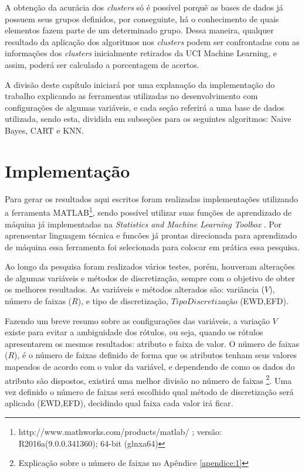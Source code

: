 A obtenção da acurácia dos \textit{clusters} só é possível porquê as bases de dados já possuem seus grupos definidos, por conseguinte, há o conhecimento de quais elementos fazem parte de um determinado grupo. Dessa maneira, qualquer resultado da aplicação dos algoritmos nos \textit{clusters} podem ser confrontadas com as informações dos \textit{clusters} inicialmente retirados da UCI Machine Learning, e assim, poderá ser calculado a porcentagem de acertos.

A divisão deste capítulo iniciará por uma explanação da implementação do trabalho explicando as ferramentas  utilizadas no desenvolvimento com configurações  de algumas variáveis, e cada seção referirá a uma base de dados utilizada, sendo esta, dividida em subseções para os seguintes algoritmos: Naive Bayes, CART e KNN.

\section{Implementação}\label{cap:resultados:sec:implement}

Para  gerar os resultados aqui escritos foram realizadas implementações utilizando a ferramenta MATLAB\footnote{http://www.mathworks.com/products/matlab/ ; versão: R2016a(9.0.0.341360); 64-bit (glnxa64)}, sendo possível utilizar suas funções de aprendizado de máquina já implementadas na \textit{Statistics and Machine Learning Toolbox }. Por aprensentar  linguagem técnica e funcões já prontas direcionada para aprendizado de máquina essa ferramenta foi selecionada para colocar em prática essa pesquisa.

Ao longo da pesquisa foram realizados vários testes, porém, houveram alterações de algumas variáveis e métodos de discretização, sempre com o objetivo de obter os melhores resultados. As variáveis e métodos alterados são: variância (${V}$), número de faixas (${R}$), e tipo de discretização, ${TipoDiscretização}$ (EWD,EFD). 

Fazendo um breve resumo sobre as configurações das variáveis, a variação ${V}$ existe para evitar a ambiguidade dos rótulos, ou seja, quando os rótulos apresentarem os mesmos resultados: atributo e faixa de valor. O número de faixas (${R}$), é o número de faixas definido de forma que os atributos tenham seus valores mapeados de acordo com o valor da variável, e dependendo de como os dados do atributo são dispostos, existirá uma melhor divisão no número de faixas \footnote{Explicação sobre o número de faixas no Apêndice \ref{apendice:1}}. Uma vez definido o número de faixas será escolhido qual método de discretização será aplicado (EWD,EFD), decidindo qual faixa cada valor irá ficar.  

